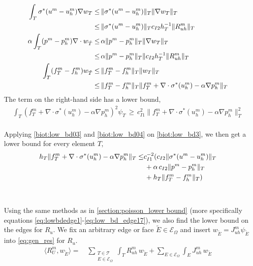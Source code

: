 \begin{align} \label{biot:low_bd03}
\int_T \sigma^{\ast}(u^m-u^m_h) \nabla w_T \leq & \, \| \sigma^{\ast}(u^m-u^m_h)\|_T\| \nabla w_T \|_T \\
\leq & \, \| \sigma^{\ast}(u^m-u^m_h)\|_T c_{I2}h_T^{-1} \|R^m_{uh}\|_T \notag\\
\alpha \int_T (p^m-p_h^m) \nabla \cdot w_{\tilde{T}} \leq & \, \alpha\| p^m-p_h^m\|_T\| \nabla w_T \|_T \\
\leq & \, \alpha\| p^m-p_h^m\|_T\| c_{I2} h_T^{-1} \|R^m_{uh}\|_T \notag\\
\int_T (f^m_T - f_h^m) w_{\tilde{T}} \leq & \, \| f^m_T-f^m_h\|_T \|w_T\|_T \\
\leq & \, \| f^m_T-f^m_h\|_T \|f^m_T + \nabla \cdot \sigma^{\ast}(u^m_h) - \alpha \nabla p^m_h\|_T \notag
\end{align}
The term on the right-hand side has a lower bound,
\begin{align}\label{biot:low_bd04}
\displaystyle\int_T (f_T^m + \nabla \cdot \sigma^{\ast}(u_h^m) - \alpha \nabla p_h^m)^2 \psi_T \, \geq \, c_{I1}^2 \|f_T^m + \nabla \cdot \sigma^{\ast}(u_h^m) - \alpha \nabla p_h^m \|_T^2
\end{align}
\\
Applying \eqref{biot:low_bd03} and \eqref{biot:low_bd04} on \eqref{biot:low_bd3}, we then get a lower bound for every element $T$,
\\
\begin{align} \label{biot:element_low_bd}
h_T\|f_T^m + \nabla \cdot \sigma^{\ast}(u_h^m) - \alpha \nabla p_h^m \|_T \leq & c_{I1}^{-2} (c_{I2}\|\sigma^{\ast}(u^m-u^m_h) \|_T \\
& \, + \alpha \, c_{I2}\| p^m-p_h^m\|_T \notag \\
& \, + h_T\| f^m_T-f^m_h\|_T) \notag
\end{align}
\\
\\
Using the same methods as in \ref{section:poisson_lower bound} (more specifically equations \eqref{eq:lowbdedge1}-\eqref{eq:low_bd_edge17}), we also find the lower bound on the edges for $R_u$. We fix an arbitrary edge or face $\tilde{E} \in \mathcal{E}_\Omega$ and insert $w_{\tilde{E}} = J^m_{uh}\psi_{\tilde{E}}$ into \eqref{eq:gen_res} for $R_u$.
\begin{align} \label{biot:lowbdedge1}
\langle R^m_U, w_{\tilde{E}} \rangle = & \, \sum_{\substack{T \in \mathcal{T} \\ E \in \mathcal{E}_\Omega}} \int_T R^m_{uh}\, w_{\tilde{E}}  + \sum_{E \in \mathcal{E}_\Omega} \int_E J^m_{uh} \, w_{\tilde{E}} 
\end{align}
